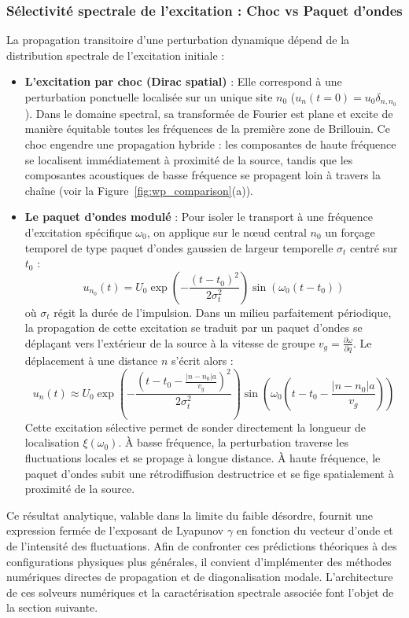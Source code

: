 \subsubsection{Sélectivité spectrale de l'excitation : Choc vs Paquet d'ondes}
La propagation transitoire d'une perturbation dynamique dépend de la distribution spectrale de l'excitation initiale :
\begin{itemize}
    \item \textbf{L'excitation par choc (Dirac spatial)} : Elle correspond à une perturbation ponctuelle localisée sur un unique site $n_0$ ($u_n(t=0) = u_0 \delta_{n, n_0}$). Dans le domaine spectral, sa transformée de Fourier est plane et excite de manière équitable toutes les fréquences de la première zone de Brillouin. Ce choc engendre une propagation hybride : les composantes de haute fréquence se localisent immédiatement à proximité de la source, tandis que les composantes acoustiques de basse fréquence se propagent loin à travers la chaîne (voir la Figure~\ref{fig:wp_comparison}(a)).
    \item \textbf{Le paquet d'ondes modulé} : Pour isoler le transport à une fréquence d'excitation spécifique $\omega_0$, on applique sur le nœud central $n_0$ un forçage temporel de type paquet d'ondes gaussien de largeur temporelle $\sigma_t$ centré sur $t_0$ :
    \begin{equation*}
        u_{n_0}(t) = U_0 \exp\left( -\frac{(t-t_0)^2}{2\sigma_t^2} \right) \sin\left( \omega_0 (t - t_0) \right)
    \end{equation*}
    où $\sigma_t$ régit la durée de l'impulsion. Dans un milieu parfaitement périodique, la propagation de cette excitation se traduit par un paquet d'ondes se déplaçant vers l'extérieur de la source à la vitesse de groupe $v_g = \frac{\partial \omega}{\partial q}$. Le déplacement à une distance $n$ s'écrit alors :
    \begin{equation*}
        u_n(t) \approx U_0 \exp\left( -\frac{\left( t - t_0 - \frac{|n-n_0|a}{v_g} \right)^2}{2\sigma_t^2} \right) \sin\left( \omega_0 \left( t - t_0 - \frac{|n - n_0|a}{v_g} \right) \right)
    \end{equation*}
    Cette excitation sélective permet de sonder directement la longueur de localisation $\xi(\omega_0)$. À basse fréquence, la perturbation traverse les fluctuations locales et se propage à longue distance. À haute fréquence, le paquet d'ondes subit une rétrodiffusion destructrice et se fige spatialement à proximité de la source.
\end{itemize}

Ce résultat analytique, valable dans la limite du faible désordre, fournit une expression fermée de l'exposant de Lyapunov $\gamma$ en fonction du vecteur d'onde et de l'intensité des fluctuations. Afin de confronter ces prédictions théoriques à des configurations physiques plus générales, il convient d'implémenter des méthodes numériques directes de propagation et de diagonalisation modale. L'architecture de ces solveurs numériques et la caractérisation spectrale associée font l'objet de la section suivante.